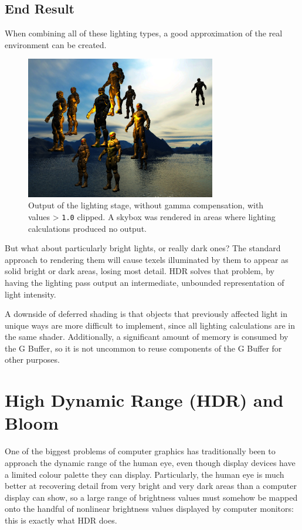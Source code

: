 \documentclass[11pt, oneside]{report}
\begin{document}
\section{End Result}
When combining all of these lighting types, a good approximation of the real environment can be created.

\begin{figure}[!htbp]
   \centering
   \includegraphics[width=0.74\textwidth]{images/lighting_out.png}
   \caption{Output of the lighting stage, without gamma compensation, with values > \texttt{1.0} clipped. A \gls{skybox} was rendered in areas where lighting calculations produced no output.}
   \label{fig:example}
\end{figure}

But what about particularly bright lights, or really dark ones? The standard approach to rendering them will cause \glspl{texel} illuminated by them to appear as solid bright or dark areas, losing most detail. \gls{HDR} solves that problem, by having the lighting pass output an intermediate, unbounded representation of light intensity.

A downside of deferred shading is that objects that previously affected light in unique ways are more difficult to implement, since all lighting calculations are in the same shader. Additionally, a significant amount of memory is consumed by the \gls{G Buffer}, so it is not uncommon to reuse components of the \gls{G Buffer} for other purposes.


\chapter{High Dynamic Range (HDR) and Bloom}
One of the biggest problems of computer graphics has traditionally been to approach the dynamic range of the human eye, even though display devices have a limited colour palette they can display. Particularly, the human eye is much better at recovering detail from very bright and very dark areas than a computer display can show, so a large range of brightness values must somehow be mapped onto the handful of nonlinear brightness values displayed by computer monitors: this is exactly what \gls{HDR} does.
\end{document}
